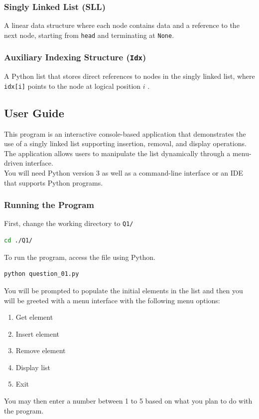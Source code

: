\documentclass[12pt]{article}
\begin{document}
\subsubsection{Singly Linked List (SLL)}
A linear data structure where each node contains data and a reference to the next node, starting from \texttt{head} and terminating at \texttt{None}\parencite{GeeksforGeeks_SinglyLinkedListTutorial_2026,WsCubeTech_SinglyLinkedListDataStructure_2025}.

\subsubsection{Auxiliary Indexing Structure (\texttt{Idx})}
A Python list that stores direct references to nodes in the singly linked list, where \texttt{idx[i]} points to the node at logical position $i$ \parencite{Rowell_BigOCheatSheet}.

\subsection{User Guide}

This program is an interactive console-based application that demonstrates the use of a singly linked list supporting insertion, removal, and display operations. The application allows users to manipulate the list dynamically through a menu-driven interface.\\

\noindent You will need Python version 3 as well as a command-line interface or an IDE that supports Python programs.

\subsubsection{Running the Program}

First, change the working directory to \texttt{Q1/}

\begin{lstlisting}[language=bash]
cd ./Q1/
\end{lstlisting}

\noindent To run the program, access the file using Python.

\begin{lstlisting}[language=bash]
python question_01.py
\end{lstlisting}

\noindent You will be prompted to populate the initial elements in the list and then you will be greeted with a menu interface with the following menu options:
\begin{enumerate}
    \item Get element
    \item Insert element
    \item Remove element
    \item Display list
    \item Exit
\end{enumerate}
You may then enter a number between 1 to 5 based on what you plan to do with the program.
\end{document}
